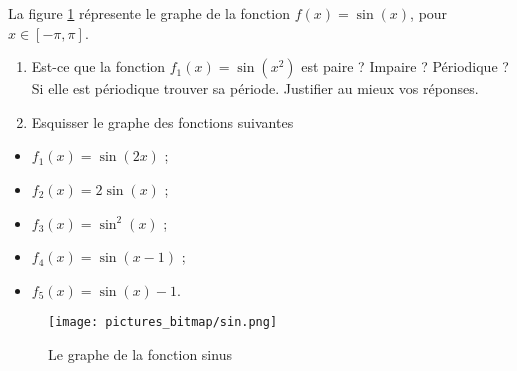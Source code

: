 \begin{exercice}\label{exoDS2012-1-0001}

La figure \ref{graphesin} r\'epresente le graphe de la fonction $f(x)=\sin(x)$, pour $x\in[-\pi,\pi]$. 

\begin{enumerate}
\item Est-ce que la fonction $f_1(x)=\sin(x^2)$ est paire ? Impaire ? P\'eriodique ? Si elle est p\'eriodique trouver sa p\'eriode. Justifier au mieux vos réponses.  
\item Esquisser le graphe des fonctions suivantes  
\end{enumerate}

 
\begin{multicols}{3}
  \begin{itemize}
    \renewcommand{\labelitemi}{$\bullet$}
  \item $f_1(x)=\sin(2x)$ ;
  \item $f_2(x)=2\sin(x)$ ;
  \item $f_3(x)=\sin^2(x)$ ;
  \item $f_4(x)=\sin(x-1)$ ;
  \item $f_5(x)=\sin(x)-1$.
  \end{itemize}
\end{multicols}

\begin{figure}
 \begin{center}
  \caption{Le graphe de la fonction sinus}
   \texttt{[image: pictures\_bitmap/sin.png]}\label{graphesin}
\end{center}
\end{figure}


\end{exercice}
